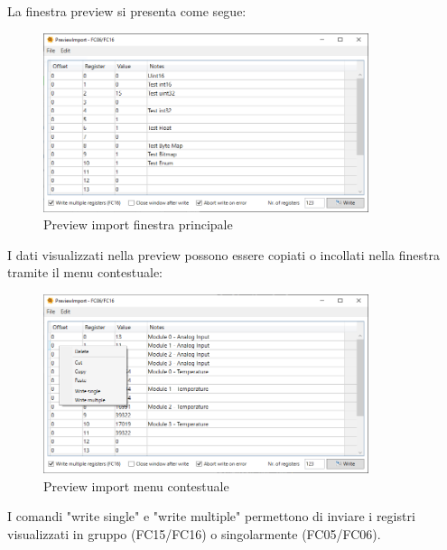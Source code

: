 \newpage
La finestra preview si presenta come segue:

\begin{figure}[H]
\centering
\includegraphics[width=0.85\textwidth]{../Img/PreviewImport_Main.PNG}
\caption{Preview import finestra principale}
\end{figure}

I dati visualizzati nella preview possono essere copiati o incollati
nella finestra tramite il menu contestuale:

\begin{figure}[H]
\centering
\includegraphics[width=0.85\textwidth]{../Img/PreviewImport_ContextMenu.PNG}
\caption{Preview import menu contestuale}
\end{figure}

I comandi "write single" e "write multiple" permettono di inviare
i registri visualizzati in gruppo (FC15/FC16) o singolarmente (FC05/FC06).



